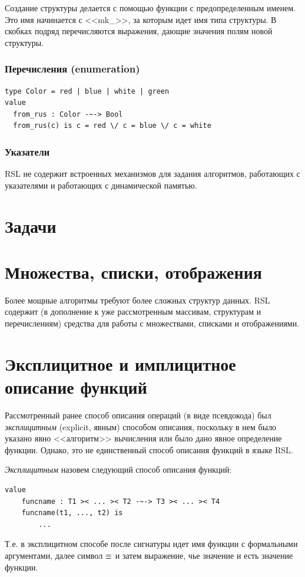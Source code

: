 \documentclass[14pt, twoside]{extreport}
\newcounter{problem_type}[chapter]
\newcommand{\head}[1]{\vspace{1cm}\subsubsection*{#1}}
\begin{document}
Создание структуры делается с помощью функции с предопределенным именем. Это имя начинается с <<mk\_>>, за которым идет имя типа структуры. В скобках подряд перечисляются выражения, дающие значения полям новой структуры.

\head{Перечисления (enumeration)}
\begin{lstlisting}
type Color = red | blue | white | green
value
  from_rus : Color -~-> Bool
  from_rus(c) is c = red \/ c = blue \/ c = white
\end{lstlisting}

\head{Указатели}
RSL не содержит встроенных механизмов для задания алгоритмов, работающих с указателями и работающих с динамической памятью.

    \section*{Задачи}

    

\section{Множества, списки, отображения}

Более мощные алгоритмы требуют более сложных структур данных. RSL содержит (в дополнение к уже рассмотренным массивам, структурам и перечислениям) средства для работы с множествами, списками и отображениями. 



\section{Эксплицитное и имплицитное описание функций}

Рассмотренный ранее способ описания операций (в виде псевдокода) был \emph{эксплицитным} (explicit, явным) способом описания, поскольку в нем было указано явно <<алгоритм>> вычисления или было дано явное определение функции. Однако, это не единственный способ описания функций в языке RSL.

\emph{Эксплицитным} назовем следующий способ описания функций:
\begin{lstlisting}
value
	funcname : T1 >< ... >< T2 -~-> T3 >< ... >< T4
	funcname(t1, ..., t2) is
		... 
\end{lstlisting}

Т.е. в эксплицитном способе после сигнатуры идет имя функции с формальными аргументами, далее символ $\mathop{\equiv}$ и затем выражение, чье значение и есть значение функции.
\end{document}
